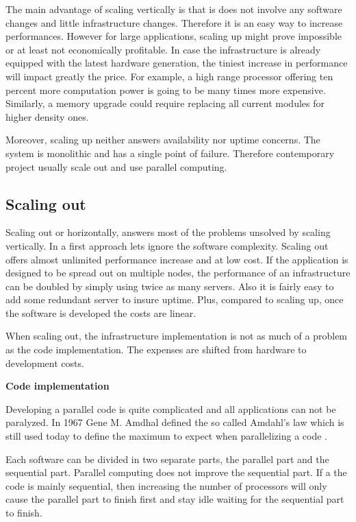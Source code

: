 The main advantage of scaling vertically is that is does not involve any software
changes and little infrastructure changes. Therefore it is an easy way to
increase performances. However for large applications, scaling up might prove
impossible or at least not economically profitable. In case the infrastructure 
is already equipped with the latest hardware generation, the tiniest
increase in performance will impact greatly the price. For example, a high
range processor offering ten percent more computation power is going to be
many times more expensive. Similarly, a memory upgrade could require replacing
all current modules for higher density ones.

Moreover, scaling up neither answers availability nor uptime concerns. The
system is monolithic and has a single point of failure. Therefore contemporary
project usually scale out and use parallel computing.

\subsection{Scaling out}
				
Scaling out or horizontally, answers most of the problems unsolved by scaling
vertically. In a first approach lets ignore the software complexity.  Scaling
out offers almost unlimited performance increase and at low cost. If the
application is designed to be spread out on multiple nodes, the performance of
an infrastructure can be doubled by simply using twice as many servers. Also it
is fairly easy to add some redundant server to insure uptime. Plus, compared to
scaling up, once the software is developed the costs are linear.

When scaling out, the infrastructure implementation is not as much of a problem as
the code implementation. The expenses are shifted from hardware to development
costs.

\textbf{Code implementation}

Developing a parallel code is quite complicated and all applications can not
be paralyzed. In 1967 Gene M. Amdhal defined the so called Amdahl's law which
is still used today to define the maximum to expect when parallelizing a code
\citep{Reference10}. 

Each software can be divided in two separate parts, the parallel part and the
sequential part. Parallel computing does not improve the sequential part. If a
the code is mainly sequential, then increasing the number of processors will
only cause the parallel part to finish first and stay idle waiting for the
sequential part to finish.

